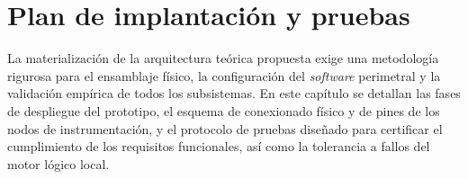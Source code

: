 \newpage
\section{Plan de implantación y pruebas}
\label{cap:plan_implantacion}


La materialización de la arquitectura teórica propuesta exige una metodología rigurosa para el ensamblaje físico, la configuración del \textit{software} perimetral y la validación empírica de todos los subsistemas. En este capítulo se detallan las fases de despliegue del prototipo, el esquema de conexionado físico y de pines de los nodos de instrumentación, y el protocolo de pruebas diseñado para certificar el cumplimiento de los requisitos funcionales, así como la tolerancia a fallos del motor lógico local.

